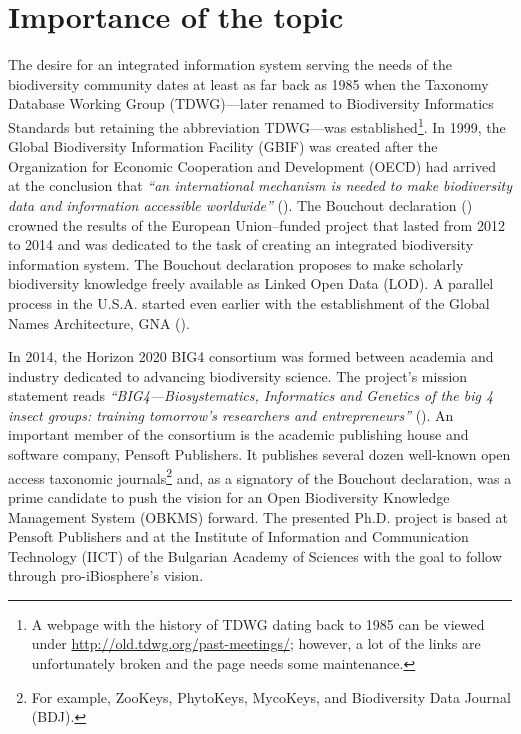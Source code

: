 \label{chapter-introduction} 
\newcommand{\keyword}[1]{\textbf{#1}}
\newcommand{\tabhead}[1]{\textbf{#1}}
\newcommand{\code}[1]{\texttt{#1}}
\newcommand{\file}[1]{\texttt{\bfseries#1}}
\newcommand{\option}[1]{\texttt{\itshape#1}}
\section*{Importance of the topic}
The desire for an integrated information system serving the needs of the biodiversity community dates at least as far back as 1985 when the Taxonomy Database Working Group (TDWG)---later renamed to Biodiversity Informatics Standards but retaining the abbreviation TDWG---was established\footnote{A webpage with the history of TDWG dating back to 1985 can be viewed under \url{http://old.tdwg.org/past-meetings/}; however, a lot of the links are unfortunately broken and the page needs some maintenance.}. In 1999, the Global Biodiversity Information Facility (GBIF) was created after the Organization for Economic Cooperation and Development (OECD) had arrived at the conclusion that \emph{``an international mechanism is needed to make biodiversity data and information accessible worldwide''} (\cite{noauthor_what_nodate}).  The Bouchout declaration (\cite{noauthor_bouchout_2014}) crowned the results of the European Union--funded project \cite{noauthor_pro-ibiosphere_nodate} that lasted from 2012 to 2014 and was dedicated to the task of creating an integrated biodiversity information system. The Bouchout declaration proposes to make scholarly biodiversity knowledge freely available as Linked Open Data (LOD).  A parallel process in the U.S.A. started even earlier with the establishment of the Global Names Architecture, GNA (\cite{patterson_names_2010,pyle_towards_2016}).

In 2014, the Horizon 2020 BIG4 consortium was formed between academia and industry dedicated to advancing biodiversity science.  The project's mission statement reads \emph{``BIG4---Biosystematics, Informatics and Genetics of the big 4 insect groups: training tomorrow's researchers and entrepreneurs''} (\cite{university_of_copenhagen_big4_2014}). An important member of the consortium is the academic publishing house and software company, Pensoft Publishers. It publishes several dozen well-known open access taxonomic journals\footnote{For example, ZooKeys, PhytoKeys, MycoKeys, and Biodiversity Data Journal (BDJ).} and, as a signatory of the Bouchout declaration, was a prime candidate to push the vision for an Open Biodiversity Knowledge Management System (OBKMS) forward. The presented Ph.D. project is based at Pensoft Publishers and at the Institute of Information and Communication Technology (IICT) of the Bulgarian Academy of Sciences with the goal to follow through pro-iBiosphere's vision.

